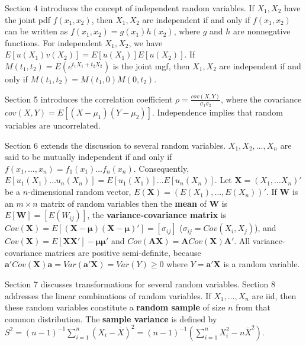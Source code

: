 Section 4 introduces the concept of independent random variables. If $X_1,X_2$ have the joint pdf $f(x_1,x_2)$, then $X_1,X_2$ are independent if and only if $f(x_1,x_2)$ can be written as $f(x_1,x_2)=g(x_1)h(x_2)$, where $g$ and $h$ are nonnegative functions. For independent $X_1,X_2$, we have $E[u(X_1)v(X_2)]=E[u(X_1)]E[u(X_2)]$. If $M(t_1,t_2)=E(e^{t_1X_1+t_2X_2})$ is the joint mgf, then $X_1,X_2$ are independent if and only if $M(t_1,t_2)=M(t_1,0)M(0,t_2)$.

Section 5 introduces the correlation coefficient $\rho=\frac{cov(X,Y)}{\sigma_1\sigma_2}$, where the covariance $cov(X,Y)=E[(X-\mu_1)(Y-\mu_2)]$. Independence implies that random variables are uncorrelated.

Section 6 extends the discussion to several random variables. $X_1,X_2,\dots,X_{n}$ are said to be mutually independent if and only if $f(x_1,\dots,x_{n})=f_1(x_1)\dots f_{n}(x_{n})$. Consequently, $E[u_1(X_1)\dots u_{n}(X_{n})]=E[u_1(X_1)]\dots E[u_{n}(X_{n})]$. Let $\mathbf{X}=(X_1,\dots X_{n})'$ be a $n$-dimensional random vector, $E(\mathbf{X})=(E(X_1),\dots,E(X_{n}))'$. If $\mathbf{W}$ is an $m\times n$ matrix of random variables then the \textbf{mean} of $\mathbf{W}$ is $E[\mathbf{W}]=[E(W_{ij})]$, the \textbf{variance-covariance matrix} is $Cov(\mathbf{X})=E[(\mathbf{X}-\boldsymbol{\mu})(\mathbf{X}-\boldsymbol{\mu})']=[\sigma _{ij}]$ ($\sigma _{ij}=Cov(X_i,X_j)$), and $Cov(\mathbf{X})=E[\mathbf{X}\mathbf{X}']-\boldsymbol{\mu}\boldsymbol{\mu}'$ and $Cov(\mathbf{AX})=\mathbf{A}Cov(\mathbf{X})\mathbf{A}'$. All variance-covariance matrices are positive semi-definite, because $\mathbf{a}'Cov (\mathbf{X})\mathbf{a}=Var (\mathbf{a}'\mathbf{X})=Var (Y)\geq0$ where $Y=\mathbf{a}'\mathbf{X}$ is a random variable.

Section 7 discusses transformations for several random variables. Section 8 addresses the linear combinations of random variables. If $X_1,\dots,X_n$ are iid, then these random variables constitute a \textbf{random sample} of size $n$ from that common distribution. The \textbf{sample variance} is defined by $S^{2}=(n-1)^{-1}\sum_{i=1}^{n}(X_i-\overline{X})^{2}=(n-1)^{-1}\left( \sum_{i=1}^{n}X_i^{2} -n\overline{X}^{2}\right)$.
